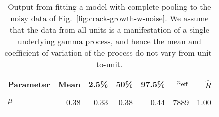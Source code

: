 \begin{table}
\centering
\caption{\label{tab:cp}Output from fitting a model with complete pooling to the noisy data of Fig.~\ref{fig:crack-growth-w-noise}. We assume that the data from all units is a manifestation of a single underlying gamma process, and hence the mean and coefficient of variation of the process do not vary from unit-to-unit.}
\centering
\begin{tabular}[t]{lrrrrrr}
\toprule
Parameter & Mean & 2.5\% & 50\% & 97.5\% & $n_{\small{\mbox{eff}}}$ & $\hat{R}$\\
\midrule
\cellcolor{gray!10}{$\sigma$} & \cellcolor{gray!10}{0.03} & \cellcolor{gray!10}{0.02} & \cellcolor{gray!10}{0.03} & \cellcolor{gray!10}{0.04} & \cellcolor{gray!10}{2003} & \cellcolor{gray!10}{1.00}\\
$\mu$ & 0.38 & 0.33 & 0.38 & 0.44 & 7889 & 1.00\\
\cellcolor{gray!10}{$\nu$} & \cellcolor{gray!10}{0.21} & \cellcolor{gray!10}{0.15} & \cellcolor{gray!10}{0.21} & \cellcolor{gray!10}{0.29} & \cellcolor{gray!10}{652} & \cellcolor{gray!10}{1.01}\\
\bottomrule
\end{tabular}
\end{table}
